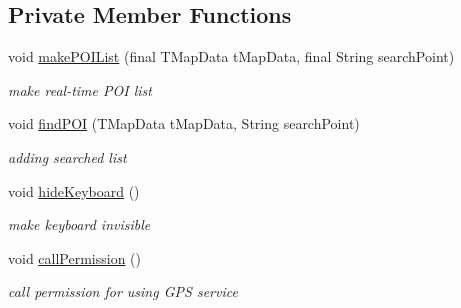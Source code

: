 \subsection*{Private Member Functions}
\begin{DoxyCompactItemize}
\item 
void \mbox{\hyperlink{classhi_1_1world_1_1hello_1_1myapplication_1_1_main_activity_aad358ef4e1b34e425313ce7c975f296e}{make\+P\+O\+I\+List}} (final T\+Map\+Data t\+Map\+Data, final String search\+Point)
\begin{DoxyCompactList}\small\item\em make real-\/time P\+OI list \end{DoxyCompactList}\item 
void \mbox{\hyperlink{classhi_1_1world_1_1hello_1_1myapplication_1_1_main_activity_a5158048f64f8e9a2f15147a963451402}{find\+P\+OI}} (T\+Map\+Data t\+Map\+Data, String search\+Point)
\begin{DoxyCompactList}\small\item\em adding searched list \end{DoxyCompactList}\item 
void \mbox{\hyperlink{classhi_1_1world_1_1hello_1_1myapplication_1_1_main_activity_aee2622f19c780867f2c875b3e0a2b1a0}{hide\+Keyboard}} ()
\begin{DoxyCompactList}\small\item\em make keyboard invisible \end{DoxyCompactList}\item 
void \mbox{\hyperlink{classhi_1_1world_1_1hello_1_1myapplication_1_1_main_activity_ae61743a762c89114c69122afb6743aef}{call\+Permission}} ()
\begin{DoxyCompactList}\small\item\em call permission for using G\+PS service \end{DoxyCompactList}\end{DoxyCompactItemize}
